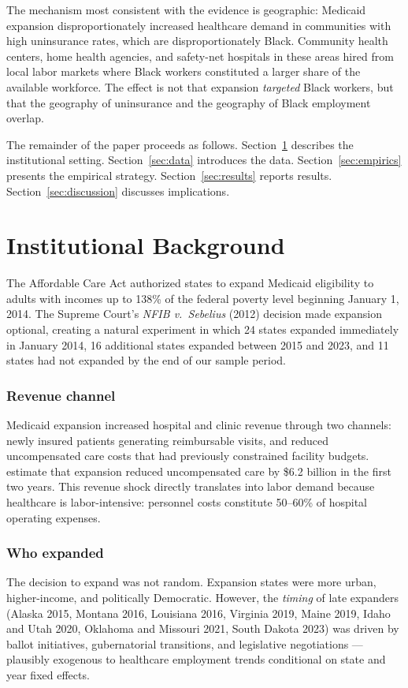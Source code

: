 \documentclass[12pt]{article}
\begin{document}
The mechanism most consistent with the evidence is geographic: Medicaid expansion disproportionately increased healthcare demand in communities with high uninsurance rates, which are disproportionately Black. Community health centers, home health agencies, and safety-net hospitals in these areas hired from local labor markets where Black workers constituted a larger share of the available workforce. The effect is not that expansion \textit{targeted} Black workers, but that the geography of uninsurance and the geography of Black employment overlap.

The remainder of the paper proceeds as follows. Section~\ref{sec:background} describes the institutional setting. Section~\ref{sec:data} introduces the data. Section~\ref{sec:empirics} presents the empirical strategy. Section~\ref{sec:results} reports results. Section~\ref{sec:discussion} discusses implications.

\section{Institutional Background}
\label{sec:background}

The Affordable Care Act authorized states to expand Medicaid eligibility to adults with incomes up to 138\% of the federal poverty level beginning January 1, 2014. The Supreme Court's \textit{NFIB v.\ Sebelius} (2012) decision made expansion optional, creating a natural experiment in which 24 states expanded immediately in January 2014, 16 additional states expanded between 2015 and 2023, and 11 states had not expanded by the end of our sample period.

\subsubsection*{Revenue channel} Medicaid expansion increased hospital and clinic revenue through two channels: newly insured patients generating reimbursable visits, and reduced uncompensated care costs that had previously constrained facility budgets. \citet{dranove2019} estimate that expansion reduced uncompensated care by \$6.2 billion in the first two years. This revenue shock directly translates into labor demand because healthcare is labor-intensive: personnel costs constitute 50--60\% of hospital operating expenses.

\subsubsection*{Who expanded} The decision to expand was not random. Expansion states were more urban, higher-income, and politically Democratic. However, the \textit{timing} of late expanders (Alaska 2015, Montana 2016, Louisiana 2016, Virginia 2019, Maine 2019, Idaho and Utah 2020, Oklahoma and Missouri 2021, South Dakota 2023) was driven by ballot initiatives, gubernatorial transitions, and legislative negotiations --- plausibly exogenous to healthcare employment trends conditional on state and year fixed effects.
\end{document}
